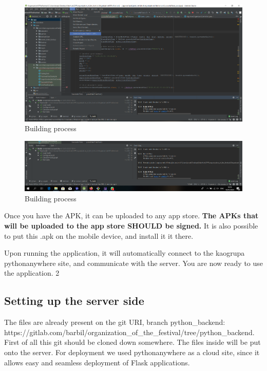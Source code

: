 			\begin{figure}[H]
				\includegraphics[width=\linewidth]{images/Deploy_M_4.png}
				\caption{Building process}
				\label{fig:install_4}
			\end{figure}
			
			\begin{figure}[H]
				\includegraphics[width=\linewidth]{images/Deploy_M_5.png}
				\caption{Building process}
				\label{fig:install_5}
			\end{figure}
			
			Once you have the APK, it can be uploaded to any app store. \textbf{The APKs that will be uploaded to the app store SHOULD be signed.} It is also possible to put this .apk on the mobile device, and install it it there.
			
			Upon running the application, it will automatically connect to the kaogrupa pythonanywhere site, and communicate with the server. You are now ready to use the application. 2
			
			\subsection{Setting up the server side}
				
				The files are already present on the git URI, branch python_backend: https://gitlab.com/barbil/organization_of_the_festival/tree/python_backend. First of all this git should be cloned down somewhere. The files inside will be put onto the server. For deployment we used pythonanywhere as a cloud site, since it allows easy and seamless deployment of Flask applications.
				
